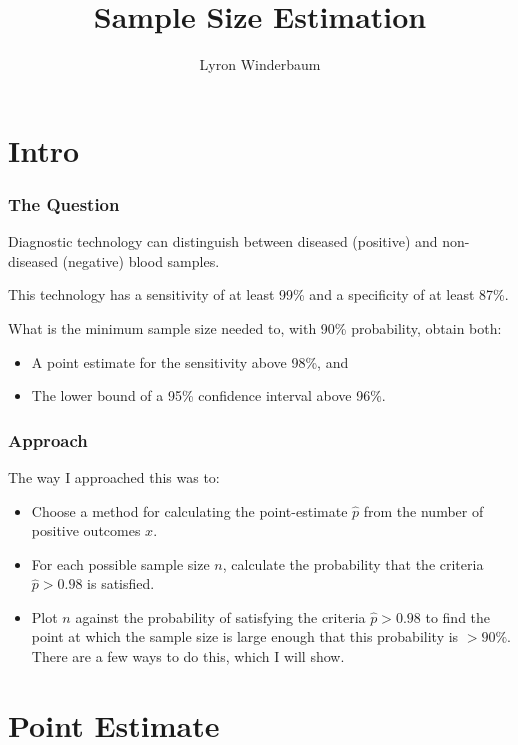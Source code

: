 \documentclass{beamer}\usepackage{knitr}
\title{Sample Size Estimation}
\author{Lyron Winderbaum}
\begin{document}
\section{Intro}

\maketitle

\begin{frame}
  \frametitle{The Question}
  
  Diagnostic technology can distinguish between diseased (positive) and non-diseased (negative) blood samples.
  
  This technology has a sensitivity of at least 99\% and a specificity of at least 87\%.
  
  What is the minimum sample size needed to, with 90\% probability, obtain both:
  \begin{itemize}
    \item A point estimate for the sensitivity above 98\%, and
    \item The lower bound of a 95\% confidence interval above 96\%.
  \end{itemize}
  
\end{frame}




\begin{frame}
\frametitle{Approach}

The way I approached this was to:
\begin{itemize}
  \item Choose a method for calculating the point-estimate $\hat{p}$ from the number of positive outcomes $x$. 
  \item For each possible sample size $n$, calculate the probability that the criteria $\hat{p} > 0.98$ is satisfied.
  \item Plot $n$ against the probability of satisfying the criteria $\hat{p} > 0.98$ to find the point at which the sample size is large enough that this probability is $> 90\%$. There are a few ways to do this, which I will show. 
\end{itemize}

\end{frame}



\section{Point Estimate}
\end{document}
